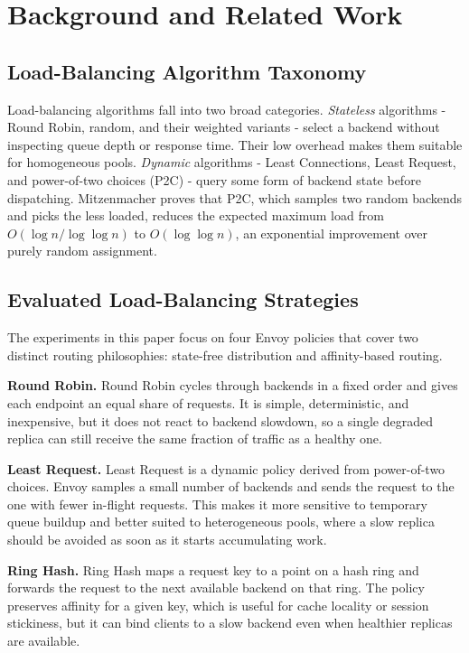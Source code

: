 \documentclass[conference]{IEEEtran}
\begin{document}
\section{Background and Related Work}
\label{sec:background}

\subsection{Load-Balancing Algorithm Taxonomy}

Load-balancing algorithms fall into two broad categories.
\textit{Stateless} algorithms - Round Robin, random, and their weighted
variants - select a backend without inspecting queue depth or response time.
Their low overhead makes them suitable for homogeneous pools.
\textit{Dynamic} algorithms - Least Connections, Least Request, and
power-of-two choices (P2C) - query some form of backend state before
dispatching.
Mitzenmacher \cite{mitzenmacher2001power} proves that P2C, which samples two
random backends and picks the less loaded, reduces the expected maximum load
from $O(\log n / \log \log n)$ to $O(\log \log n)$, an exponential
improvement over purely random assignment.

\subsection{Evaluated Load-Balancing Strategies}

The experiments in this paper focus on four Envoy policies that cover two
distinct routing philosophies: state-free distribution and affinity-based
routing.

\textbf{Round Robin.}
Round Robin cycles through backends in a fixed order and gives each endpoint an
equal share of requests. It is simple, deterministic, and inexpensive, but it
does not react to backend slowdown, so a single degraded replica can still
receive the same fraction of traffic as a healthy one.

\textbf{Least Request.}
Least Request is a dynamic policy derived from power-of-two choices. Envoy
samples a small number of backends and sends the request to the one with fewer
in-flight requests. This makes it more sensitive to temporary queue buildup and
better suited to heterogeneous pools, where a slow replica should be avoided as
soon as it starts accumulating work.

\textbf{Ring Hash.}
Ring Hash maps a request key to a point on a hash ring and forwards the request
to the next available backend on that ring. The policy preserves affinity for a
given key, which is useful for cache locality or session stickiness, but it can
bind clients to a slow backend even when healthier replicas are available.
\end{document}
